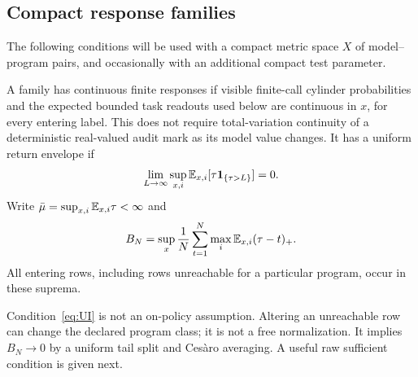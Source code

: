 \subsection{Compact response families}
The following conditions will be used with a compact metric space $X$ of model--program pairs, and occasionally with an additional compact test parameter.

\begin{definition}\label{def:responses}
A family has continuous finite responses if visible finite-call cylinder probabilities and the expected bounded task readouts used below are continuous in $x$, for every entering label. This does not require total-variation continuity of a deterministic real-valued audit mark as its model value changes. It has a uniform return envelope if
\begin{equation}\label{eq:UI}
 \lim_{L\to\infty}\sup_{x,i}\mathbb E_{x,i}[\tau\mathbf 1_{\{\tau>L\}}]=0.
\end{equation}
Write $\bar\mu=\sup_{x,i}\mathbb E_{x,i}\tau<\infty$ and
\begin{equation}\label{eq:tail-def}
 B_N=\sup_x\frac1N\sum_{t=1}^N\max_i\mathbb E_{x,i}(\tau-t)_+.
\end{equation}
All entering rows, including rows unreachable for a particular program, occur in these suprema.
\end{definition}
Condition~\eqref{eq:UI} is not an on-policy assumption. Altering an unreachable row can change the declared program class; it is not a free normalization. It implies $B_N\to0$ by a uniform tail split and Ces\`aro averaging. A useful raw sufficient condition is given next.

